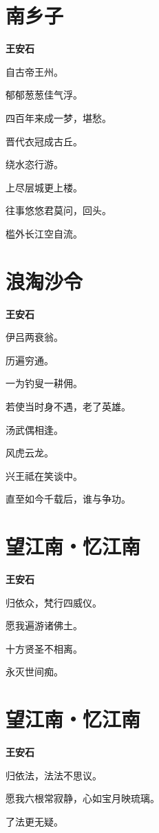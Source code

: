 \documentclass[12pt,a4paper]{ctexbook}
\begin{document}
\section{南乡子}
\textbf{王安石}\par\vspace{0.5em}
自古帝王州。\par
郁郁葱葱佳气浮。\par
四百年来成一梦，堪愁。\par
晋代衣冠成古丘。\par
绕水恣行游。\par
上尽层城更上楼。\par
往事悠悠君莫问，回头。\par
槛外长江空自流。\par

\section{浪淘沙令}
\textbf{王安石}\par\vspace{0.5em}
伊吕两衰翁。\par
历遍穷通。\par
一为钓叟一耕佣。\par
若使当时身不遇，老了英雄。\par
汤武偶相逢。\par
风虎云龙。\par
兴王祗在笑谈中。\par
直至如今千载后，谁与争功。\par

\section{望江南・忆江南}
\textbf{王安石}\par\vspace{0.5em}
归依众，梵行四威仪。\par
愿我遍游诸佛土。\par
十方贤圣不相离。\par
永灭世间痴。\par

\section{望江南・忆江南}
\textbf{王安石}\par\vspace{0.5em}
归依法，法法不思议。\par
愿我六根常寂静，心如宝月映琉璃。\par
了法更无疑。\par
\end{document}

